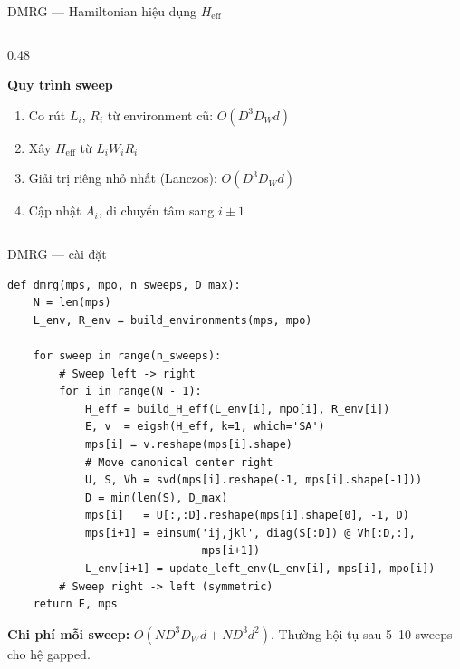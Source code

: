\documentclass[aspectratio=169, 11pt]{beamer}
\begin{document}
\begin{frame}[shrink=3]{DMRG --- Hamiltonian hiệu dụng $H_\text{eff}$}
\begin{columns}[T]
\begin{column}{0.48\textwidth}
\begin{center}
\end{center}

\vspace{6pt}
\textcolor{qamber}{\textbf{Quy trình sweep}}\\[2pt]
{\small
\begin{enumerate}
  \item Co rút $L_i$, $R_i$ từ environment cũ: $O(D^3 D_W d)$
  \item Xây $H_\text{eff}$ từ $L_i W_i R_i$
  \item Giải trị riêng nhỏ nhất (Lanczos): $O(D^3 D_W d)$
  \item Cập nhật $A_i$, di chuyển tâm sang $i{\pm}1$
\end{enumerate}}

\end{column}
\end{columns}

\end{frame}

\begin{frame}[fragile, shrink=3]{DMRG --- cài đặt}

\begin{lstlisting}
def dmrg(mps, mpo, n_sweeps, D_max):
    N = len(mps)
    L_env, R_env = build_environments(mps, mpo)

    for sweep in range(n_sweeps):
        # Sweep left -> right
        for i in range(N - 1):
            H_eff = build_H_eff(L_env[i], mpo[i], R_env[i])
            E, v  = eigsh(H_eff, k=1, which='SA')
            mps[i] = v.reshape(mps[i].shape)
            # Move canonical center right
            U, S, Vh = svd(mps[i].reshape(-1, mps[i].shape[-1]))
            D = min(len(S), D_max)
            mps[i]   = U[:,:D].reshape(mps[i].shape[0], -1, D)
            mps[i+1] = einsum('ij,jkl', diag(S[:D]) @ Vh[:D,:],
                              mps[i+1])
            L_env[i+1] = update_left_env(L_env[i], mps[i], mpo[i])
        # Sweep right -> left (symmetric)
    return E, mps
\end{lstlisting}

\vspace{4pt}
{\small\textcolor{dimtext}{\textbf{Chi phí mỗi sweep:} $O(ND^3 D_W d + ND^3 d^2)$. Thường hội tụ sau 5--10 sweeps cho hệ gapped.}}

\end{frame}
\end{document}
